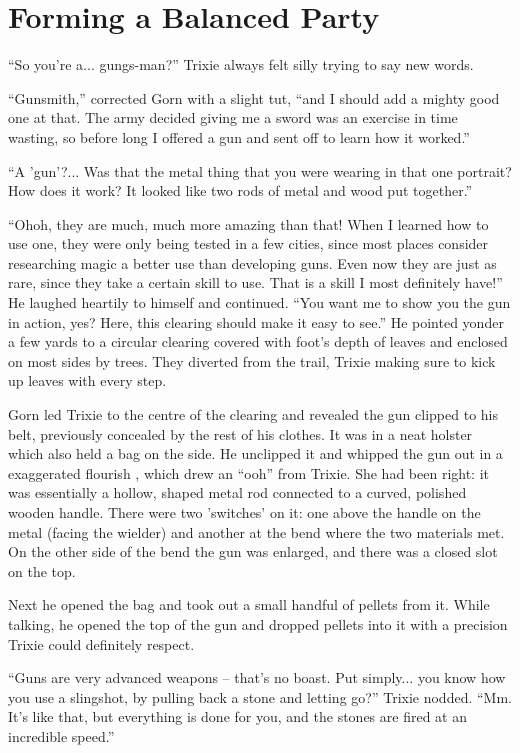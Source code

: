 \scenesep

\section{Forming a Balanced Party}

``So you're a... gungs-man?'' Trixie always felt silly trying to say new words.

``Gunsmith,'' corrected Gorn with a slight tut, ``and I should add a mighty good
one at that. The army decided giving me a sword was an exercise in time wasting,
so before long I offered a gun and sent off to learn how it worked.''

``A 'gun'?... Was that the metal thing that you were wearing in that one
portrait? How does it work? It looked like two rods of metal and wood put
together.''

``Ohoh, they are much, much more amazing than that! When I learned how to use
one, they were only being tested in a few cities, since most places consider
researching magic a better use than developing guns. Even now they are just as
rare, since they take a certain skill to use. That is a skill I most definitely
have!'' He laughed heartily to himself and continued. ``You want me to show you
the gun in action, yes? Here, this clearing should make it easy to see.'' He
pointed yonder a few yards to a circular clearing covered with foot's depth of
leaves and enclosed on most sides by trees. They diverted from the trail, Trixie
making sure to kick up leaves with every step.

Gorn led Trixie to the centre of the clearing and revealed the gun clipped to
his belt, previously concealed by the rest of his clothes. It was in a neat
holster which also held a bag on the side. He unclipped it and whipped the gun
out in a exaggerated flourish , which drew an ``ooh'' from Trixie. She had been
right: it was essentially a hollow, shaped metal rod connected to a curved,
polished wooden handle. There were two 'switches' on it: one above the handle on
the metal (facing the wielder) and another at the bend where the two materials
met. On the other side of the bend the gun was enlarged, and there was a closed
slot on the top.

Next he opened the bag and took out a small handful of pellets from it. While
talking, he opened the top of the gun and dropped pellets into it with a
precision Trixie could definitely respect.

``Guns are very advanced weapons -- that's no boast. Put simply... you know how
you use a slingshot, by pulling back a stone and letting go?'' Trixie nodded.
``Mm. It's like that, but everything is done for you, and the stones are fired
at an incredible speed.''

